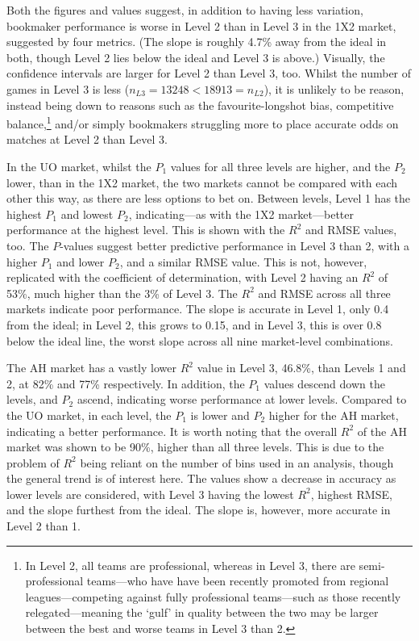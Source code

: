 \documentclass[a4paper,10pt]{report}
\begin{document}
Both the figures and values suggest, in addition to having less variation, bookmaker performance is worse in Level 2 than in Level 3 in the 1X2 market, suggested by four metrics. (The slope is roughly 4.7\% away from the ideal in both, though Level 2 lies below the ideal and Level 3 is above.) Visually, the confidence intervals are larger for Level 2 than Level 3, too. Whilst the number of games in Level 3 is less ($n_{L3} = 13248 < 18913 = n_{L2}$), it is unlikely to be reason, instead being down to reasons such as the favourite-longshot bias, competitive balance,\footnote{In Level 2, all teams are professional, whereas in Level 3, there are semi-professional teams---who have have been recently promoted from regional leagues---competing against fully professional teams---such as those recently relegated---meaning the `gulf' in quality between the two may be larger between the best and worse teams in Level 3 than 2.} and/or simply bookmakers struggling more to place accurate odds on matches at Level 2 than Level 3.\vspace{3mm}

In the UO market, whilst the $P_1$ values for all three levels are higher, and the $P_2$ lower, than in the 1X2 market, the two markets cannot be compared with each other this way, as there are less options to bet on. Between levels, Level 1 has the highest $P_1$ and lowest $P_2$, indicating---as with the 1X2 market---better performance at the highest level. This is shown with the $R^2$ and RMSE values, too. The $P$-values suggest better predictive performance in Level 3 than 2, with a higher $P_1$ and lower $P_2$, and a similar RMSE value. This is not, however, replicated with the coefficient of determination, with Level 2 having an $R^2$ of 53\%, much higher than the 3\% of Level 3. The $R^2$ and RMSE across all three markets indicate poor performance. The slope is accurate in Level 1, only 0.4 from the ideal; in Level 2, this grows to 0.15, and in Level 3, this is over 0.8 below the ideal line, the worst slope across all nine market-level combinations. \vspace{3mm}

The AH market has a vastly lower $R^2$ value in Level 3, 46.8\%, than Levels 1 and 2, at 82\% and 77\% respectively. In addition, the $P_1$ values descend down the levels, and $P_2$ ascend, indicating worse performance at lower levels. Compared to the UO market, in each level, the $P_1$ is lower and $P_2$ higher for the AH market, indicating a better performance. It is worth noting that the overall $R^2$ of the AH market was shown to be 90\%, higher than all three levels. This is due to the problem of $R^2$ being reliant on the number of bins used in an analysis, though the general trend is of interest here. The values show a decrease in accuracy as lower levels are considered, with Level 3 having the lowest $R^2$, highest RMSE, and the slope furthest from the ideal. The slope is, however, more accurate in Level 2 than 1.
 
\end{document}
